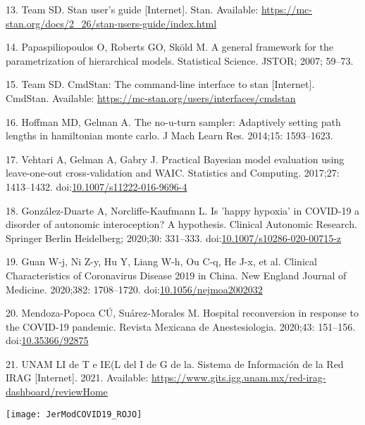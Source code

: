 \documentclass[10pt,letterpaper]{article}
\begin{document}
\leavevmode\hypertarget{ref-stanmanual}{}%
13. Team SD. Stan user's guide {[}Internet{]}. Stan. Available:
\url{https://mc-stan.org/docs/2_26/stan-users-guide/index.html}

\leavevmode\hypertarget{ref-papaspiliopoulos2007general}{}%
14. Papaspiliopoulos O, Roberts GO, Sköld M. A general framework for the
parametrization of hierarchical models. Statistical Science. JSTOR;
2007; 59--73.

\leavevmode\hypertarget{ref-standevelopment}{}%
15. Team SD. CmdStan: The command-line interface to stan {[}Internet{]}.
CmdStan. Available: \url{https://mc-stan.org/users/interfaces/cmdstan}

\leavevmode\hypertarget{ref-hoffman2014no}{}%
16. Hoffman MD, Gelman A. The no-u-turn sampler: Adaptively setting path
lengths in hamiltonian monte carlo. J Mach Learn Res. 2014;15:
1593--1623.

\leavevmode\hypertarget{ref-Vehtari2017}{}%
17. Vehtari A, Gelman A, Gabry J. Practical Bayesian model evaluation
using leave-one-out cross-validation and WAIC. Statistics and Computing.
2017;27: 1413--1432.
doi:\href{https://doi.org/10.1007/s11222-016-9696-4}{10.1007/s11222-016-9696-4}

\leavevmode\hypertarget{ref-Gonzalez-Duarte2020}{}%
18. González-Duarte A, Norcliffe-Kaufmann L. Is 'happy hypoxia' in
COVID-19 a disorder of autonomic interoception? A hypothesis. Clinical
Autonomic Research. Springer Berlin Heidelberg; 2020;30: 331--333.
doi:\href{https://doi.org/10.1007/s10286-020-00715-z}{10.1007/s10286-020-00715-z}

\leavevmode\hypertarget{ref-Guan2020}{}%
19. Guan W-j, Ni Z-y, Hu Y, Liang W-h, Ou C-q, He J-x, et al. Clinical
Characteristics of Coronavirus Disease 2019 in China. New England
Journal of Medicine. 2020;382: 1708--1720.
doi:\href{https://doi.org/10.1056/nejmoa2002032}{10.1056/nejmoa2002032}

\leavevmode\hypertarget{ref-Mendoza-Popoca2020}{}%
20. Mendoza-Popoca CÚ, Suárez-Morales M. Hospital reconversion in
response to the COVID-19 pandemic. Revista Mexicana de Anestesiologia.
2020;43: 151--156.
doi:\href{https://doi.org/10.35366/92875}{10.35366/92875}

\leavevmode\hypertarget{ref-UNAM2021}{}%
21. UNAM LI de T e IE(L del I de G de la. Sistema de Información de la
Red IRAG {[}Internet{]}. 2021. Available:
\url{https://www.gits.igg.unam.mx/red-irag-dashboard/reviewHome}

\newpage

\begin{center}\texttt{[image: JerModCOVID19\_ROJO]} \end{center}
\end{document}

